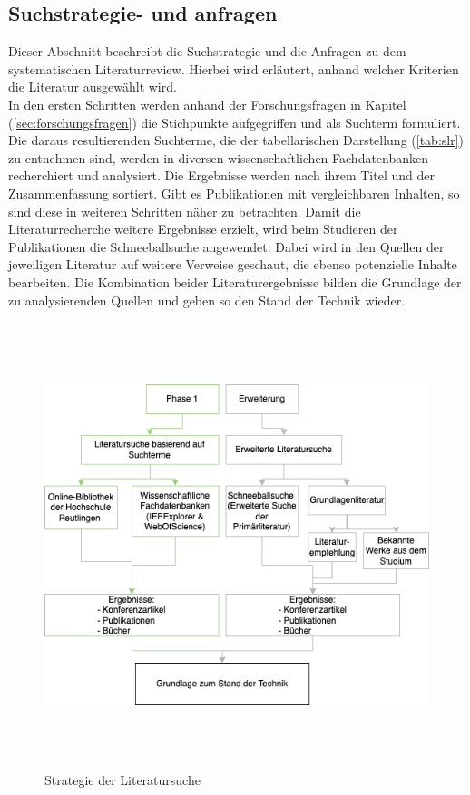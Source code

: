     \subsection{Suchstrategie- und anfragen}
        Dieser Abschnitt beschreibt die Suchstrategie und die Anfragen zu dem systematischen Literaturreview. Hierbei wird 
        erläutert, anhand welcher Kriterien die Literatur ausgewählt wird.
        \\
        In den ersten Schritten werden anhand der Forschungsfragen in Kapitel (\ref{sec:forschungsfragen}) die Stichpunkte 
        aufgegriffen und als Suchterm formuliert. Die daraus resultierenden Suchterme, die der tabellarischen Darstellung 
        (\ref{tab:slr}) zu entnehmen sind, werden in diversen wissenschaftlichen Fachdatenbanken recherchiert und analysiert. 
        Die Ergebnisse werden nach ihrem Titel und der Zusammenfassung sortiert. Gibt es Publikationen mit vergleichbaren 
        Inhalten, so sind diese in weiteren Schritten näher zu betrachten. Damit die Literaturrecherche weitere Ergebnisse 
        erzielt, wird beim Studieren der Publikationen die Schneeballsuche angewendet. Dabei wird in den Quellen der jeweiligen 
        Literatur auf weitere Verweise geschaut, die ebenso potenzielle Inhalte bearbeiten. Die Kombination beider 
        Literaturergebnisse bilden die Grundlage der zu analysierenden Quellen und geben so den Stand der Technik wieder.
        \begin{figure}[hbt!]
            \centering
            \includegraphics[width=13cm,height=13cm,keepaspectratio]{images/slr_walkthrough.png}
            \caption{Strategie der Literatursuche}
            \label{fig:slr}
        \end{figure}
